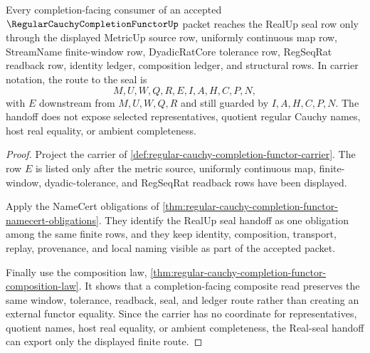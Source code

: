 \begin{theorem}
\label{thm:regular-cauchy-completion-functor-real-seal-handoff}
Every completion-facing consumer of an accepted $\RegularCauchyCompletionFunctorUp$ packet reaches the RealUp seal row only through the displayed MetricUp source row, uniformly continuous map row, StreamName finite-window row, DyadicRatCore tolerance row, RegSeqRat readback row, identity ledger, composition ledger, and structural rows. In carrier notation, the route to the seal is
$$
M,U,W,Q,R,E,I,A,H,C,P,N,
$$
with $E$ downstream from $M,U,W,Q,R$ and still guarded by $I,A,H,C,P,N$. The handoff does not expose selected representatives, quotient regular Cauchy names, host real equality, or ambient completeness.
\end{theorem}
\begin{proof}
Project the carrier of \autoref{def:regular-cauchy-completion-functor-carrier}. The row $E$ is listed only after the metric source, uniformly continuous map, finite-window, dyadic-tolerance, and RegSeqRat readback rows have been displayed.

Apply the NameCert obligations of \autoref{thm:regular-cauchy-completion-functor-namecert-obligations}. They identify the RealUp seal handoff as one obligation among the same finite rows, and they keep identity, composition, transport, replay, provenance, and local naming visible as part of the accepted packet.

Finally use the composition law, \autoref{thm:regular-cauchy-completion-functor-composition-law}. It shows that a completion-facing composite read preserves the same window, tolerance, readback, seal, and ledger route rather than creating an external functor equality. Since the carrier has no coordinate for representatives, quotient names, host real equality, or ambient completeness, the Real-seal handoff can export only the displayed finite route.
\end{proof}



